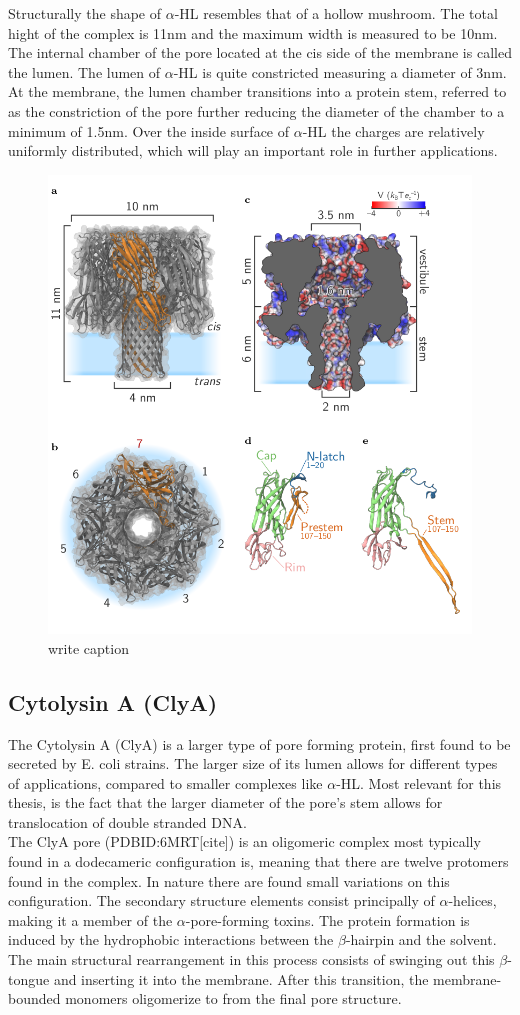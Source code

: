 Structurally the shape of $\alpha$-HL resembles that of a hollow mushroom. The total
hight of the complex is 11nm and the maximum width is measured to be 10nm. The internal
chamber of the pore located at the cis side of the membrane is called the lumen.
The lumen of $\alpha$-HL is quite constricted measuring a diameter of 3nm. At the
membrane, the lumen chamber transitions into a protein stem, referred to as the
constriction of the pore further reducing the diameter of the chamber to a minimum of
1.5nm. Over the inside surface of  $\alpha$-HL the charges are relatively uniformly
distributed, which will play an important role in further applications.\\

\begin{figure}[h!]
  \centering
  \includegraphics[width=0.5\linewidth]{Figures/alpha-hemolysin.png}
  \caption{write caption}
  \label{adsf}
\end{figure}


\subsection{Cytolysin A (ClyA)}

The Cytolysin A (ClyA) is a larger type of pore forming protein, first found to be
secreted by E. coli strains. The larger size of its lumen allows for different types of
applications, compared to smaller complexes like $\alpha$-HL. Most relevant for this
thesis, is the fact that the larger diameter of the pore's stem allows for translocation
of double stranded DNA.\\

The ClyA pore (PDBID:6MRT[cite]) is an oligomeric complex most typically found in a
 dodecameric configuration is, meaning that there are twelve protomers found in the
complex. In nature there are found small variations on this configuration. The secondary
structure elements consist principally of $\alpha$-helices, making it a member of the $
\alpha$-pore-forming toxins. The protein formation is induced by the hydrophobic
interactions between the $\beta$-hairpin and the solvent. The main structural
rearrangement in this process consists of swinging
out this $\beta$-tongue and inserting it into the membrane. After this transition, the
membrane-bounded monomers oligomerize to from the final pore structure.

